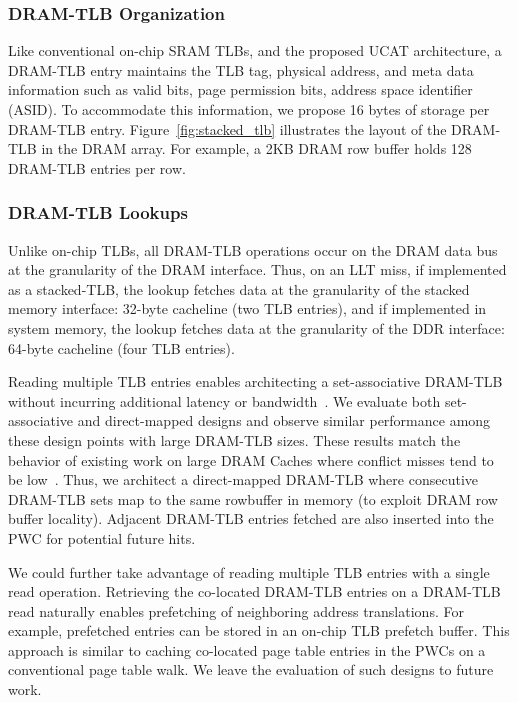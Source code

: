 
\subsubsection{DRAM-TLB Organization}

\noindent Like conventional on-chip SRAM TLBs, and the proposed UCAT
architecture, a DRAM-TLB entry maintains the TLB tag, physical
address, and meta data information such as valid bits, page permission
bits, address space identifier (ASID). To accommodate this
information, we propose 16 bytes of storage per DRAM-TLB entry.
Figure~\ref{fig:stacked_tlb} illustrates the layout of the DRAM-TLB in
the DRAM array. For example, a 2KB DRAM row buffer holds 128 DRAM-TLB
entries per row.

\newpage
\subsubsection{DRAM-TLB Lookups}

\noindent Unlike on-chip TLBs, all DRAM-TLB operations occur on the
DRAM data bus at the granularity of the DRAM interface. Thus, on an
LLT miss, if implemented as a stacked-TLB, the lookup fetches data at
the granularity of the stacked memory interface: 32-byte cacheline
(two TLB entries), and if implemented in system memory, the lookup
fetches data at the granularity of the DDR interface: 64-byte
cacheline (four TLB entries).

Reading multiple TLB entries enables architecting a set-associative
DRAM-TLB without incurring additional latency or
bandwidth~\cite{moin2012,loh2011}. 
We evaluate both set-associative and direct-mapped
designs and observe similar performance among these design points with large DRAM-TLB sizes.
These results match the behavior of
existing work on large DRAM Caches where conflict misses tend to be
low~\cite{moin2012}. Thus, we architect a direct-mapped DRAM-TLB where
consecutive DRAM-TLB sets map to the same rowbuffer in memory (to
exploit DRAM row buffer locality). Adjacent DRAM-TLB entries fetched
are also inserted into the PWC for potential future hits.

We could further take advantage of reading multiple TLB entries with a
single read operation. Retrieving the co-located DRAM-TLB entries on a
DRAM-TLB read naturally enables prefetching of neighboring address
translations. For example, prefetched entries can be stored in an
on-chip TLB prefetch buffer. This approach is similar to caching
co-located page table entries in the PWCs on a conventional page table
walk. We leave the evaluation of such designs to future work.


